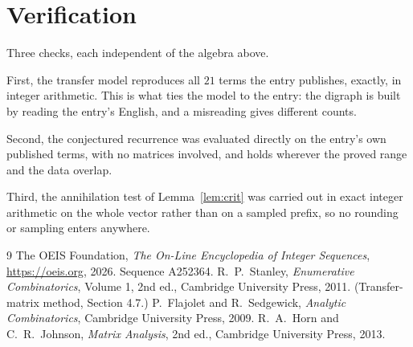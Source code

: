 \documentclass[11pt,a4paper]{article}
\theoremstyle{plain}
\theoremstyle{definition}
\begin{document}
\section{Verification}

Three checks, each independent of the algebra above.

First, the transfer model reproduces all $21$ terms the entry publishes, exactly, in
integer arithmetic. This is what ties the model to the entry: the digraph is built by reading
the entry's English, and a misreading gives different counts.

Second, the conjectured recurrence was evaluated directly on the entry's own published terms,
with no matrices involved, and holds wherever the proved range and the data overlap.

Third, the annihilation test of Lemma~\ref{lem:crit} was carried out in exact integer
arithmetic on the whole vector rather than on a sampled prefix, so no rounding or sampling
enters anywhere.

\begin{thebibliography}{9}
 The OEIS Foundation, \emph{The On-Line Encyclopedia of Integer
Sequences}, \url{https://oeis.org}, 2026. Sequence A252364.
 R.~P.~Stanley, \emph{Enumerative Combinatorics}, Volume 1, 2nd ed.,
Cambridge University Press, 2011. (Transfer-matrix method, Section 4.7.)
 P.~Flajolet and R.~Sedgewick, \emph{Analytic Combinatorics}, Cambridge
University Press, 2009.
 R.~A.~Horn and C.~R.~Johnson, \emph{Matrix Analysis}, 2nd ed., Cambridge
University Press, 2013.
\end{thebibliography}
\end{document}
